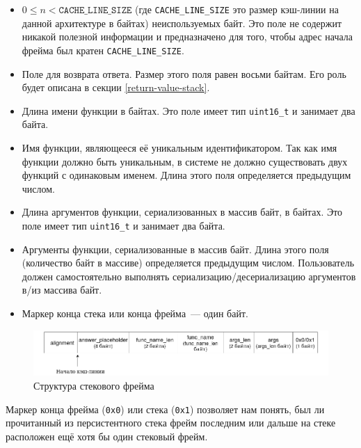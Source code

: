 \documentclass[times,specification,annotation]{itmo-student-thesis}
\begin{document}
\begin{itemize}
    \item $0 \leq n < \texttt{CACHE\_LINE\_SIZE}$ (где \texttt{CACHE\_LINE\_SIZE} это размер кэш-линии на данной архитектуре в байтах) неиспользуемых байт. Это поле не содержит никакой полезной информации и предназначено для того, чтобы адрес начала фрейма был кратен \texttt{CACHE\_LINE\_SIZE}. 
    
    \item Поле для возврата ответа. Размер этого поля равен восьми байтам. Его роль будет описана в секции \ref{return-value-stack}.
    
    \item Длина имени функции в байтах. Это поле имеет тип \texttt{uint16\_t} и занимает два байта.
    
    \item Имя функции, являющееся её уникальным идентификатором. Так как имя функции должно быть уникальным, в системе не должно существовать двух функций с одинаковым именем. Длина этого поля определяется предыдущим числом.

    \item Длина аргументов функции, сериализованных в массив байт, в байтах. Это поле имеет тип \texttt{uint16\_t} и занимает два байта.
    
    \item Аргументы функции, сериализованные в массив байт. Длина этого поля (количество байт в массиве) определяется предыдущим числом. Пользователь должен самостоятельно выполнять сериализацию/десериализацию аргументов в/из массива байт. 
    
    \item Маркер конца стека или конца фрейма~--- один байт.
\end{itemize}

\bigbreak

\begin{figure}[H]
  \centering
  \caption{Структура стекового фрейма}
  \label{frame-structure-pic}
  \includegraphics[width=\linewidth]{stack_frame.png}
\end{figure}

Маркер конца фрейма (\texttt{0x0}) или стека (\texttt{0x1}) позволяет нам понять, был ли прочитанный из персистентного стека фрейм последним или дальше на стеке расположен ещё хотя бы один стековый фрейм.
\end{document}
